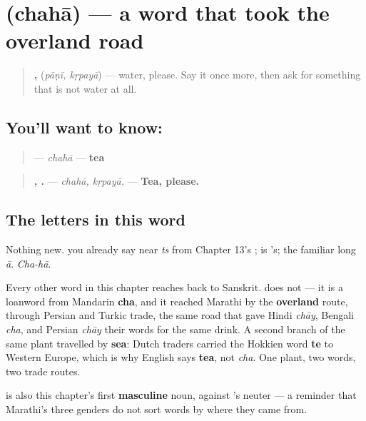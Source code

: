 \section[\texorpdfstring{\mr{चहा} (chahā)}{चहा (chahā)}]{ (chahā) — a word that took the overland road}

\label{lesson:MR-C10-chaha}



\begin{quote}
\textbf{, } (\emph{pāṇī, kṛpayā}) — water, please. Say it once more, then ask for something that is not water at all.
\end{quote}

\subsection*{You'll want to know: }
\begin{quote}
\textbf{} — \emph{chahā} — \textbf{tea}
\end{quote}

\begin{quote}
\textbf{, .} — \emph{chahā, kṛpayā.} — \textbf{Tea, please.}
\end{quote}

\subsection*{The letters in this word}
Nothing new. \textbf{} you already say near \emph{ts} from Chapter 13's \textbf{}; \textbf{} is \textbf{}'s; \textbf{} the familiar long \emph{ā}. \emph{Cha-hā}.

\begin{cousinweb}
Every other word in this chapter reaches back to Sanskrit. \textbf{} does not — it is a loanword from Mandarin \textbf{cha}, and it reached Marathi by the \textbf{overland} route, through Persian and Turkic trade, the same road that gave Hindi \textbf{} \emph{chāy}, Bengali \emph{cha}, and Persian \emph{chāy} their words for the same drink. A second branch of the same plant travelled by \textbf{sea}: Dutch traders carried the Hokkien word \textbf{te} to Western Europe, which is why English says \textbf{tea}, not \emph{cha}. One plant, two words, two trade routes.

\textbf{} is also this chapter's first \textbf{masculine} noun, against \textbf{}'s neuter — a reminder that Marathi's three genders do not sort words by where they came from.
\end{cousinweb}


